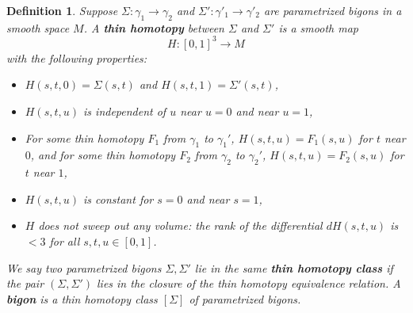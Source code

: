 \documentclass{article}
\newcommand{\maps}{\colon}
\newtheorem{definition}[theorem]{Definition}
\newcommand{\et}{\hspace{-0.08in}{\bf .}\hspace{0.1in}}
\def\of #1{\!\left({#1}\right)}
\begin{document}
\begin{definition} \et
\label{bigon}
Suppose $\Sigma \maps \gamma_1 \to \gamma_2$ and
$\Sigma' \maps \gamma'_1 \to \gamma'_2$ are parametrized
bigons in a smooth space $M$.  A {\bf thin homotopy} between
$\Sigma$ and $\Sigma'$ is a smooth map 
\[
  H \maps [0,1]^3 \to M
\]
with the following properties:
\begin{itemize}

\item 
$H\of{s,t,0} = \Sigma\of{s,t}$ and $H\of{s,t,1} = \Sigma'\of{s,t}$,

\item 
$H\of{s,t,u}$ is independent of $u$ near $u = 0$ and near $u = 1$,

\item 
For some thin homotopy $F_1$ from $\gamma_1$ to $\gamma_1'$,
$H\of{s,t,u} = F_1\of{s,u}$ for $t$ near $0$, and
for some thin homotopy $F_2$ from $\gamma_2$ to $\gamma_2'$, 
$H\of{s,t,u} = F_2\of{s,u}$ for $t$ near $1$,

\item 
$H(s,t,u)$ is constant for $s = 0$ and near $s = 1$,

\item 
$H$ does not sweep out any volume: the rank of the
differential $dH(s,t,u)$ is $< 3$ for all $s,t,u \in [0,1]$.

\end{itemize}

\noindent
We say two parametrized bigons $\Sigma,\Sigma'$
lie in the same {\bf thin homotopy class}
if the pair $(\Sigma, \Sigma')$ lies in the closure of the 
thin homotopy equivalence relation.  
A {\bf bigon} is a thin homotopy class $[\Sigma]$ of parametrized bigons.
\end{definition}
\end{document}
